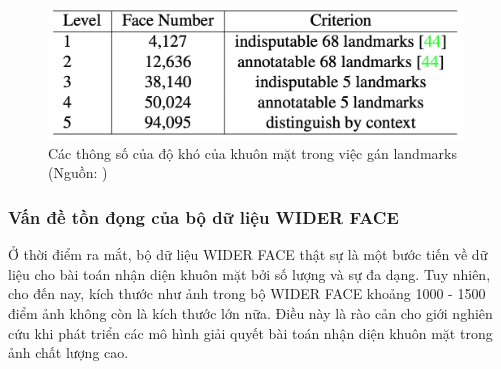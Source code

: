 {    \begin{figure}[H]
        \centering
        \includegraphics[width=11cm] {images/widerface_five_levels_lm_2}
        \caption{Các thông số của độ khó của khuôn mặt trong việc gán landmarks (Nguồn: \cite{deng2020retinaface})}
        \label{fig:widerface_five_levels_lm_2}
    \end{figure}

    \subsubsection*{Vấn đề tồn đọng của bộ dữ liệu WIDER FACE}
    Ở thời điểm ra mắt, bộ dữ liệu WIDER FACE thật sự là một bước tiến về dữ liệu cho bài toán nhận diện khuôn mặt bởi số lượng và sự đa dạng.
    Tuy nhiên, cho đến nay, kích thước như ảnh trong bộ WIDER FACE khoảng 1000 - 1500 điểm ảnh không còn là kích thước lớn nữa.
    Điều này là rào cản cho giới nghiên cứu khi phát triển các mô hình giải quyết bài toán nhận diện khuôn mặt trong ảnh chất lượng cao.
}
